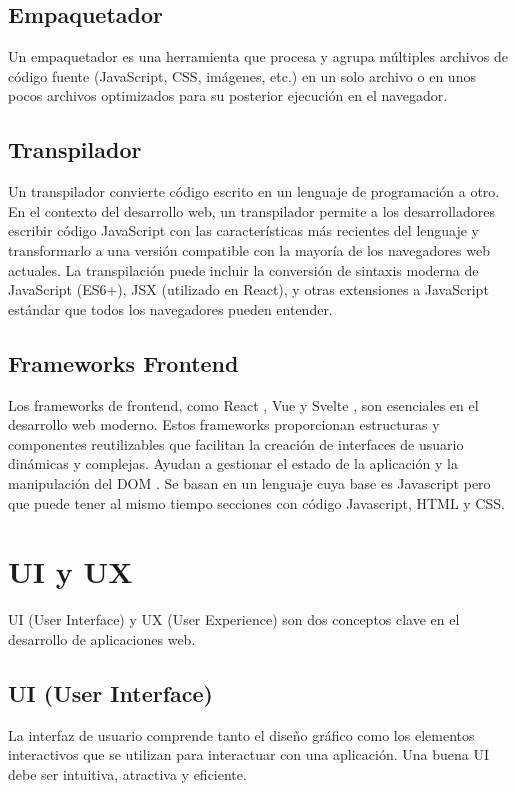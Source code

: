 \subsection{Empaquetador}
Un empaquetador \cite{bundler} es una herramienta que procesa y agrupa múltiples archivos de código fuente (JavaScript, CSS, imágenes, etc.) en un solo archivo o en unos pocos archivos optimizados para su posterior ejecución en el navegador.

\subsection{Transpilador}
Un transpilador \cite{transpiler} convierte código escrito en un lenguaje de programación a otro. En el contexto del desarrollo web, un transpilador permite a los desarrolladores escribir código JavaScript con las características más recientes del lenguaje y transformarlo a una versión compatible con la mayoría de los navegadores web actuales. 
La transpilación puede incluir la conversión de sintaxis moderna de JavaScript (ES6+), JSX (utilizado en React), y otras extensiones a JavaScript estándar que todos los navegadores pueden entender.

\subsection{Frameworks Frontend}
Los frameworks de frontend, como React \cite{react}, Vue  \cite{Vue} y Svelte \cite{Svelte}, son esenciales en el desarrollo web moderno. Estos frameworks proporcionan estructuras y componentes reutilizables que facilitan la creación de interfaces de usuario dinámicas y complejas. Ayudan a gestionar el estado de la aplicación y la manipulación del DOM \cite{mdn-docs:dom}. Se basan en un lenguaje cuya base es Javascript pero que puede tener al mismo tiempo secciones con código Javascript, HTML y CSS.

\section{UI y UX}
UI (User Interface) y UX (User Experience) son dos conceptos clave \cite{ui-ux} en el desarrollo de aplicaciones web.

\subsection{UI (User Interface)}
La interfaz de usuario comprende tanto el diseño gráfico como los elementos interactivos que se utilizan para interactuar con una aplicación. Una buena UI debe ser intuitiva, atractiva y eficiente.

